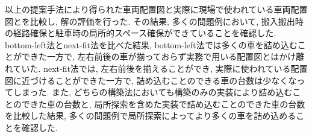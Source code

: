 以上の提案手法により得られた車両配置図と実際に現場で使われている車両配置図とを比較し, 解の評価を行った. 
その結果, 多くの問題例において, 搬入搬出時の経路確保と駐車時の局所的スペース確保ができていることを確認した. 
bottom-left法とnext-fit法を比べた結果, bottom-left法では多くの車を詰め込むことができた一方で, 左右前後の車が揃っておらず実務で用いる配置図とはかけ離れていた. 
next-fit法では, 左右前後を揃えることができ, 実際に使われている配置図に近づけることができた一方で, 詰め込むことのできる車の台数は少なくなってしまった.  
また, どちらの構築法においても構築のみの実装により詰め込むことのできた車の台数と, 局所探索を含めた実装で詰め込むことのできた車の台数を比較した結果, 多くの問題例で局所探索によってより多くの車を詰め込めることを確認した. 
